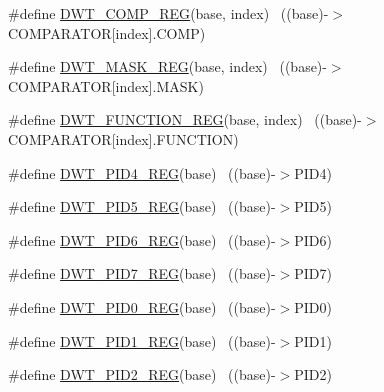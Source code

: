 \begin{DoxyCompactItemize}
\item 
\#define \hyperlink{group___d_w_t___register___accessor___macros_gad03eebac5bf5c3c3e461e156ba6e37ae}{D\+W\+T\+\_\+\+C\+O\+M\+P\+\_\+\+R\+EG}(base,  index)                              ~((base)-\/$>$C\+O\+M\+P\+A\+R\+A\+T\+OR\mbox{[}index\mbox{]}.C\+O\+MP)
\item 
\#define \hyperlink{group___d_w_t___register___accessor___macros_ga16461875f56f3b91ee27a53a9f4dbc78}{D\+W\+T\+\_\+\+M\+A\+S\+K\+\_\+\+R\+EG}(base,  index)                              ~((base)-\/$>$C\+O\+M\+P\+A\+R\+A\+T\+OR\mbox{[}index\mbox{]}.M\+A\+SK)
\item 
\#define \hyperlink{group___d_w_t___register___accessor___macros_gaedc0f311fdf85789a988b58375481265}{D\+W\+T\+\_\+\+F\+U\+N\+C\+T\+I\+O\+N\+\_\+\+R\+EG}(base,  index)                      ~((base)-\/$>$C\+O\+M\+P\+A\+R\+A\+T\+OR\mbox{[}index\mbox{]}.F\+U\+N\+C\+T\+I\+ON)
\item 
\#define \hyperlink{group___d_w_t___register___accessor___macros_gafdad2b8a5caa1715b1d7fbe6850c324d}{D\+W\+T\+\_\+\+P\+I\+D4\+\_\+\+R\+EG}(base)                                          ~((base)-\/$>$P\+I\+D4)
\item 
\#define \hyperlink{group___d_w_t___register___accessor___macros_gad638e97562bc8fa280d32b7869c712d1}{D\+W\+T\+\_\+\+P\+I\+D5\+\_\+\+R\+EG}(base)                                          ~((base)-\/$>$P\+I\+D5)
\item 
\#define \hyperlink{group___d_w_t___register___accessor___macros_gaa7f5da9ec68998f6952de46154855328}{D\+W\+T\+\_\+\+P\+I\+D6\+\_\+\+R\+EG}(base)                                          ~((base)-\/$>$P\+I\+D6)
\item 
\#define \hyperlink{group___d_w_t___register___accessor___macros_ga5dac20d58b3ff153ca8aa07e73990545}{D\+W\+T\+\_\+\+P\+I\+D7\+\_\+\+R\+EG}(base)                                          ~((base)-\/$>$P\+I\+D7)
\item 
\#define \hyperlink{group___d_w_t___register___accessor___macros_ga0f86233b0c83a9d6f4f1045787a2d2e1}{D\+W\+T\+\_\+\+P\+I\+D0\+\_\+\+R\+EG}(base)                                          ~((base)-\/$>$P\+I\+D0)
\item 
\#define \hyperlink{group___d_w_t___register___accessor___macros_ga3402a8a818794eaf102e1d7bfcaf3167}{D\+W\+T\+\_\+\+P\+I\+D1\+\_\+\+R\+EG}(base)                                          ~((base)-\/$>$P\+I\+D1)
\item 
\#define \hyperlink{group___d_w_t___register___accessor___macros_ga9e1b1b5093546468be7371b773b051bd}{D\+W\+T\+\_\+\+P\+I\+D2\+\_\+\+R\+EG}(base)                                          ~((base)-\/$>$P\+I\+D2)

\end{DoxyCompactItemize}
